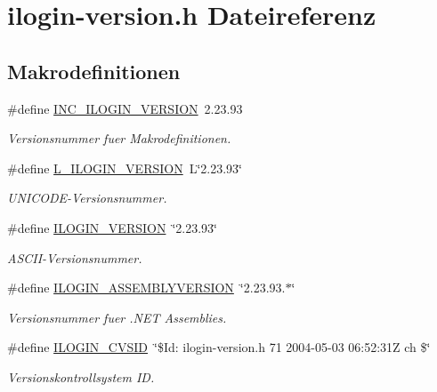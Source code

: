 \hypertarget{ilogin-version_8h}{
\section{ilogin-version.h Dateireferenz}
\label{ilogin-version_8h}
}


\subsection*{Makrodefinitionen}
\begin{CompactItemize}
\item 
\#define \hyperlink{ilogin-version_8h_a0}{INC\_\-ILOGIN\_\-VERSION}\ 2.23.93
\begin{CompactList}\small\item\em Versionsnummer fuer Makrodefinitionen. \item\end{CompactList}\item 
\#define \hyperlink{ilogin-version_8h_a1}{L\_\-ILOGIN\_\-VERSION}\ L\char`\"{}2.23.93\char`\"{}
\begin{CompactList}\small\item\em UNICODE-Versionsnummer. \item\end{CompactList}\item 
\#define \hyperlink{ilogin-version_8h_a2}{ILOGIN\_\-VERSION}\ \char`\"{}2.23.93\char`\"{}
\begin{CompactList}\small\item\em ASCII-Versionsnummer. \item\end{CompactList}\item 
\#define \hyperlink{ilogin-version_8h_a3}{ILOGIN\_\-ASSEMBLYVERSION}\ \char`\"{}2.23.93.$\ast$\char`\"{}
\begin{CompactList}\small\item\em Versionsnummer fuer .NET Assemblies. \item\end{CompactList}\item 
\#define \hyperlink{ilogin-version_8h_a4}{ILOGIN\_\-CVSID}\ \char`\"{}\$Id: ilogin-version.h 71 2004-05-03 06:52:31Z ch \$\char`\"{}
\begin{CompactList}\small\item\em Versionskontrollsystem ID. \item\end{CompactList}\end{CompactItemize}


